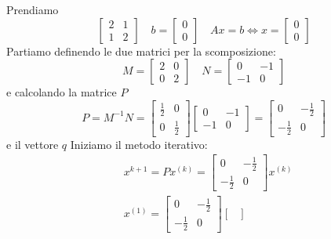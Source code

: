 \begin{example}
	Prendiamo
	\begin{equation*}
		\begin{bmatrix}
			2 & 1 \\
			1 & 2
		\end{bmatrix} \quad
		b = \begin{bmatrix}
			0 \\ 0
		\end{bmatrix} \quad
		Ax=b \Leftrightarrow x=\begin{bmatrix}
			0 \\ 0
		\end{bmatrix}
	\end{equation*}
	Partiamo definendo le due matrici per la scomposizione:
	\begin{equation*}
		M=\begin{bmatrix}
			2 & 0 \\ 0 & 2
		\end{bmatrix} \quad
		N = \begin{bmatrix}
			0 & -1 \\ -1 & 0
		\end{bmatrix}
	\end{equation*}
	e calcolando la matrice $P$
	\begin{equation*}
		P = M^{-1}N = \begin{bmatrix}
			\frac{1}{2} & 0 \\ 0 & \frac{1}{2}
		\end{bmatrix}\begin{bmatrix}
		0 & -1 \\ -1 & 0
		\end{bmatrix} = \begin{bmatrix}
		0 & -\frac{1}{2} \\ -\frac{1}{2} & 0
		\end{bmatrix}
	\end{equation*}
	e il vettore $q$
	Iniziamo il metodo iterativo:
	\begin{equation*}
		\begin{split}
			& x^{k+1} = Px^{(k)} = \begin{bmatrix}
				0 & -\frac{1}{2} \\ -\frac{1}{2} & 0
			\end{bmatrix} x^{(k)} \\
			& x^{(1)} =  \begin{bmatrix}
				0 & -\frac{1}{2} \\ -\frac{1}{2} & 0
			\end{bmatrix} \begin{bmatrix}

\end{bmatrix}
\end{split}
\end{equation*}
\end{example}
